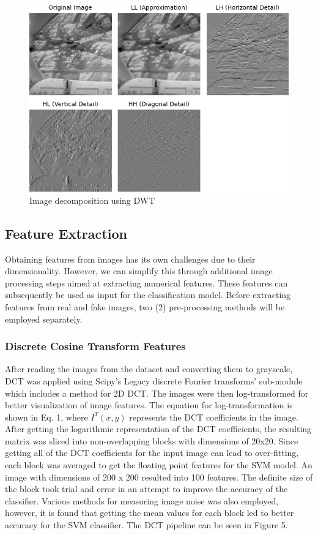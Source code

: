 \documentclass[journal]{./IEEE/IEEEtran}
\begin{document}
\begin{figure}[!ht]
    \centering
    \includegraphics{imgs/img001002_dwt.png}
    \caption{Image decomposition using DWT}
    \label{fig:enter-label}
\end{figure}

\subsection{Feature Extraction}
Obtaining features from images has its own challenges due to their dimensionality. However, we can simplify this through additional image processing steps aimed at extracting numerical features. These features can subsequently be used as input for the classification model.
Before extracting features from real and fake images, two (2) pre-processing methods will be employed separately.
\\
\subsubsection{Discrete Cosine Transform Features}
After reading the images from the dataset and converting them to grayscale, DCT was applied using Scipy's Legacy discrete Fourier transforms' sub-module which includes a method for 2D DCT. The images were then log-transformed for better visualization of image features. The equation for log-transformation is shown in Eq. 1, where  \(I^T(x,y)\) represents the DCT coefficients in the image. After getting the logarithmic representation of the DCT coefficients, the resulting matrix was sliced into non-overlapping blocks with dimensions of 20x20. Since getting all of the DCT coefficients for the input image can lead to over-fitting, each block was averaged to get the floating point features for the SVM model. An image with dimensions of 200 x 200 resulted into 100 features. The definite size of the block took trial and error in an attempt to improve the accuracy of the classifier. Various methods for measuring image noise was also employed, however, it is found that getting the mean values for each block led to better accuracy for the SVM classifier. The DCT pipeline can be seen in Figure 5. 
\end{document}
